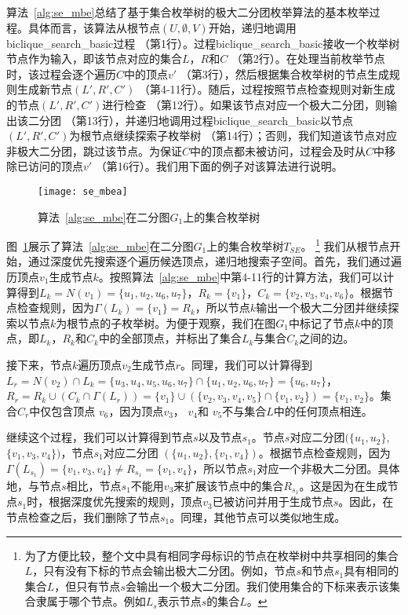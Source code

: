 算法~\ref{alg:se_mbe}总结了基于集合枚举树的极大二分团枚举算法的基本枚举过程。具体而言，该算法从根节点$(U,\emptyset,V)$开始，递归地调用\textsf{biclique\_search\_basic}过程 （第1行）。过程\textsf{biclique\_search\_basic}接收一个枚举树节点作为输入，即该节点对应的集合$L$，$R$和$C$ （第2行）。在处理当前枚举节点时，该过程会逐个遍历$C$中的顶点$v'$ （第3行），然后根据集合枚举树的节点生成规则生成新节点$(L',R',C')$ （第4-11行）。随后，过程按照节点检查规则对新生成的节点$(L',R',C')$进行检查 （第12行）。如果该节点对应一个极大二分团，则输出该二分团 （第13行），并递归地调用过程\textsf{biclique\_search\_basic}以节点$(L',R',C')$为根节点继续探索子枚举树 （第14行）；否则，我们知道该节点对应非极大二分团，跳过该节点。为保证$C$中的顶点都未被访问，过程会及时从$C$中移除已访问的顶点$v'$ （第16行）。我们用下面的例子对该算法进行说明。


\begin{figure} [ht]
  \vspace{0.1 in}
  \centering
  \texttt{[image: se\_mbea]}
  \vspace{0.1 in}
  \caption{算法~\ref{alg:se_mbe}在二分图$G_1$上的集合枚举树}
  \label{fig:se_mbea}
\end{figure}

\begin{example}
  \label{example:se}
  图~\ref{fig:se_mbea}展示了算法~\ref{alg:se_mbe}在二分图$G_1$上的集合枚举树$T_{SE}$。
  \footnote{为了方便比较，整个文中具有相同字母标识的节点在枚举树中共享相同的集合$L$，只有没有下标的节点会输出极大二分团。例如，节点$s$和节点$s_1$具有相同的集合$L$，但只有节点$s$会输出一个极大二分团。我们使用集合的下标来表示该集合隶属于哪个节点。例如$L_s$表示节点$s$的集合$L$。 
}
我们从根节点开始，通过深度优先搜索逐个遍历候选顶点，递归地搜索子空间。首先，我们通过遍历顶点$v_1$生成节点$k$。按照算法~\ref{alg:se_mbe}中第4-11行的计算方法，我们可以计算得到$L_k=N(v_1)=\{u_1, u_2, u_6, u_7\}$，$R_k=\{v_1\}$，$C_k=\{v_2,v_3,v_4,v_6\}$。根据节点检查规则，因为$\Gamma(L_{k}) = \{v_1\} = R_{k}$，所以节点$k$输出一个极大二分团并继续探索以节点$k$为根节点的子枚举树。为便于观察，我们在图$G_1$中标记了节点$k$中的顶点，即$L_k$，$R_k$和$C_k$中的全部顶点，并标出了集合$L_k$与集合$C_k$之间的边。

接下来，节点$k$遍历顶点$v_2$生成节点$r$。同理，我们可以计算得到$L_{r} = N(v_2) \cap L_{k} 
= \{u_3, u_4, u_5, u_6, u_7\} \cap \{u_1, u_2, u_6, u_7\} = \{u_6, u_7\}$， $R_{r} = R_{k} \cup (C_{k} \cap \Gamma(L_{r})) = \{v_1\} \cup (\{v_2, v_3, v_4, v_5\} \cap \{v_1, v_2\}) = \{v_1, v_2\}$。集合$C_{r}$中仅包含顶点 $v_6$，因为顶点$v_3$， $v_4$和 $v_5$不与集合$L$中的任何顶点相连。

继续这个过程，我们可以计算得到节点$s$以及节点$s_1$。节点$s$对应二分团$(\{u_1, u_2\},$ $\{v_1, v_3, v_4\})$，节点$s_1$对应二分团 $(\{u_1, u_2\}, \{v_1, v_4\})$。根据节点检查规则，因为$\Gamma(L_{s_1}) = \{v_1, v_3, v_4\} \neq R_{s_1} = \{v_1, v_4\}$，所以节点$s_1$对应一个非极大二分团。具体地，与节点$s$相比，节点$s_1$不能用$v_3$来扩展该节点中的集合$R_{s_1}$。这是因为在生成节点$s_1$时，根据深度优先搜索的规则，顶点$v_3$已被访问并用于生成节点$s$。因此，在节点检查之后，我们删除了节点$s_1$。同理，其他节点可以类似地生成。

\end{example}

